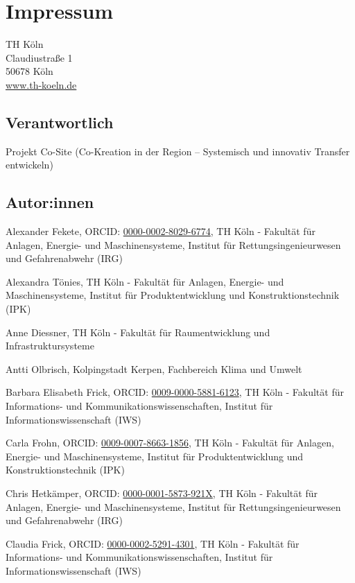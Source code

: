 
\section*{Impressum}

TH Köln\\
Claudiustraße 1\\
50678 Köln\\
\href{https://www.th-koeln.de}{www.th-koeln.de}

\subsection*{Verantwortlich}

Projekt Co-Site (Co-Kreation in der Region -- Systemisch und innovativ
Transfer entwickeln)

\subsection*{Autor:innen}

Alexander Fekete, ORCID:
\href{https://orcid.org/0000-0002-8029-6774}{0000-0002-8029-6774}, TH
Köln - Fakultät für Anlagen, Energie- und Maschinensysteme, Institut für
Rettungsingenieurwesen und Gefahrenabwehr (IRG)

Alexandra Tönies, TH Köln - Fakultät für Anlagen, Energie- und
Maschinensysteme, Institut für Produktentwicklung und
Konstruktionstechnik (IPK)

Anne Diessner, TH Köln - Fakultät für Raumentwicklung und
Infrastruktursysteme

Antti Olbrisch, Kolpingstadt Kerpen, Fachbereich Klima und Umwelt

Barbara Elisabeth Frick, ORCID:
\href{https://orcid.org/0009-0000-5881-6123}{0009-0000-5881-6123}, TH
Köln - Fakultät für Informations- und Kommunikationswissenschaften,
Institut für Informationswissenschaft (IWS)

Carla Frohn, ORCID:
\href{https://orcid.org/0009-0007-8663-1856}{0009-0007-8663-1856}, TH
Köln - Fakultät für Anlagen, Energie- und Maschinensysteme, Institut für
Produktentwicklung und Konstruktionstechnik (IPK)

Chris Hetkämper, ORCID:
\href{https://orcid.org/0000-0001-5873-921X}{0000-0001-5873-921X}, TH
Köln - Fakultät für Anlagen, Energie- und Maschinensysteme, Institut für
Rettungsingenieurwesen und Gefahrenabwehr (IRG)

Claudia Frick, ORCID:
\href{https://orcid.org/0000-0002-5291-4301}{0000-0002-5291-4301}, TH
Köln - Fakultät für Informations- und Kommunikationswissenschaften,
Institut für Informationswissenschaft (IWS)

